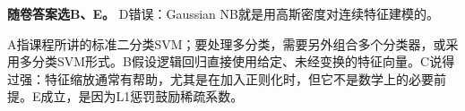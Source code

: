 \textbf{随卷答案选B、E。} D错误：Gaussian NB就是用高斯密度对连续特征建模的。


A指课程所讲的标准二分类SVM；要处理多分类，需要另外组合多个分类器，或采用多分类SVM形式。B假设逻辑回归直接使用给定、未经变换的特征向量。C说得过强：特征缩放通常有帮助，尤其是在加入正则化时，但它不是数学上的必要前提。E成立，是因为L1惩罚鼓励稀疏系数。
